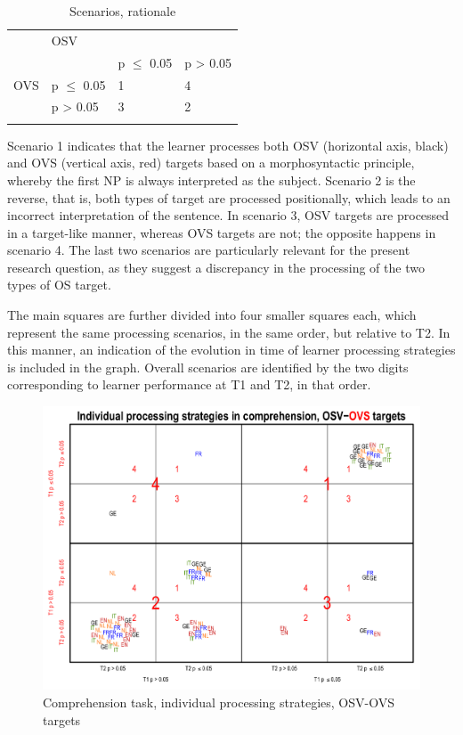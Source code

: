 \begin{table}
    \begin{tabularx}{\textwidth}{XXXX}
    \lsptoprule
    \multicolumn{2}{X}{} & \multicolumn{2}{X}{OSV}\\
    &  & p ${\leq}$ 0.05 & p > 0.05\\
    \multicolumn{1}{X}{OVS} & p ${\leq}$ 0.05 & 1 & 4\\
    & p > 0.05 & 3 & 2\\
    \lspbottomrule
    \end{tabularx}
    \caption{Scenarios, rationale}
    \label{tab:05:6}
\end{table}

Scenario 1 indicates that the learner processes both OSV (horizontal axis, black) and OVS (vertical axis, red) targets based on a morphosyntactic principle, whereby the first NP is always interpreted as the subject. Scenario 2 is the reverse, that is, both types of target are processed positionally, which leads to an incorrect interpretation of the sentence. In scenario 3, OSV targets are processed in a target-like manner, whereas OVS targets are not; the opposite happens in scenario 4. The last two scenarios are particularly relevant for the present research question, as they suggest a discrepancy in the processing of the two types of OS target.

The main squares are further divided into four smaller squares each, which represent the same processing scenarios, in the same order, but relative to T2. In this manner, an indication of the evolution in time of learner processing strategies is included in the graph. Overall scenarios are identified by the two digits corresponding to learner performance at T1 and T2, in that order.

\begin{figure}
    \includegraphics[width=\textwidth]{figures/05-8.pdf}
    \caption{Comprehension task, individual processing strategies, OSV-OVS targets}
    \label{fig:05:8}
\end{figure}


